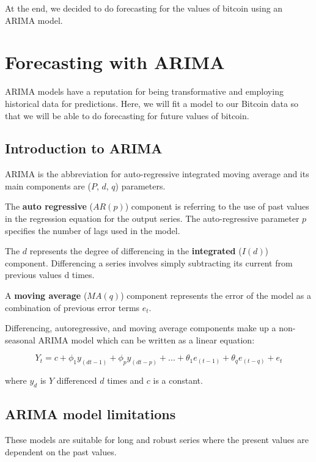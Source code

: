 \documentclass{article}
\begin{document}
At the end, we decided to do forecasting for the values of bitcoin using an ARIMA model.

\section{Forecasting with ARIMA} \label{secARIMA}
ARIMA models have a reputation for being transformative and employing historical data for predictions. Here, we will fit a model to our Bitcoin data so that we will be able to do forecasting for future values of bitcoin. 
\subsection{Introduction to ARIMA}
ARIMA is the abbreviation for auto-regressive integrated moving average and its main components are ($P$, $d$, $q$) parameters.

The \textbf{auto regressive} ($AR(p)$) component is referring to the use of past values in the regression equation for the output series. The auto-regressive parameter $p$ specifies the number of lags used in the model. 

The $d$ represents the degree of differencing in the \textbf{integrated} ($I(d)$) component. Differencing a series involves simply subtracting its current from previous values d times.

A \textbf{moving average} ($MA(q)$) component represents the error of the model as a combination of previous error terms $e_t$.
 
Differencing, autoregressive, and moving average components make up a non-seasonal ARIMA model which can be written as a linear equation:

\begin{equation}
Y_t=c+\phi_1 y_(d t-1)+\phi_p y_(d t-p)+...+\theta_1 e_(t-1)+\theta_q e_(t-q)+e_t
\end{equation}

where $y_d$ is $Y$ differenced $d$ times and $c$ is a constant.

\subsection{ARIMA model limitations}
These models are suitable for long and robust series where the present values are dependent on the past values.
 
\end{document}
